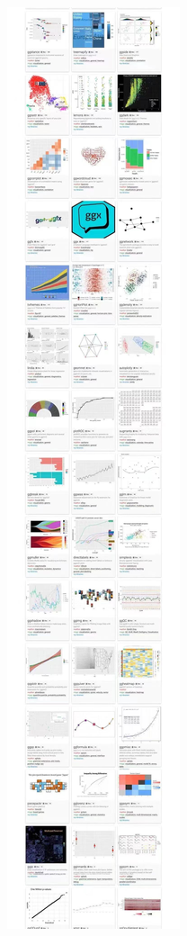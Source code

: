 \documentclass[
]{book}
\begin{document}
\includegraphics{images/38711658555602_.pic.jpg}
\end{document}
